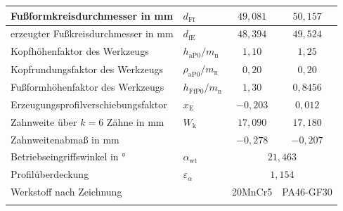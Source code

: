\begin{table}[htbp]
\begin{tabular}{llcc}
        Fußformkreisdurchmesser in mm       & $d_{\mathrm{Ff}}$                    & $49{,}081$                     & $50{,}157$ \\
        \hline
        erzeugter Fußkreisdurchmesser in mm & $d_{\mathrm{fE}}$                    & $48{,}394$                     & $49{,}524$ \\
        \hline
        Kopfhöhenfaktor des Werkzeugs       & $h_{\mathrm{aP0}}/m_{\mathrm{n}}$    & $1{,}10$                       & $1{,}25$   \\
        \hline
        Kopfrundungsfaktor des Werkzeugs    & $\rho_{\mathrm{aP0}}/m_{\mathrm{n}}$ & $0{,}20$                       & $0{,}20$   \\
        \hline
        Fußformhöhenfaktor des Werkzeugs    & $h_{\mathrm{FfP0}}/m_{\mathrm{n}}$   & $1{,}30$                       & $0{,}8456$ \\
        \hline
        Erzeugungsprofilverschiebungsfaktor & $x_{\mathrm{E}}$                     & $-0{,}203$                     & $0{,}012$  \\
        \hline
        Zahnweite über $k = 6$ Zähne in mm  & $W_{\mathrm{k}}$                     & $17{,}090$                     & $17{,}180$ \\
        \hline
        Zahnweitenabmaß in mm               &                                      & $-0{,}278$                     & $-0{,}207$ \\
        \hline
        Betriebseingriffswinkel in °        & $\alpha_{\mathrm{wt}}$               & \multicolumn{2}{c}{$21{,}463$}              \\
        \hline
        Profilüberdeckung                   & $\varepsilon_{\alpha}$               & \multicolumn{2}{c}{$1{,}154$}               \\
        \hline
        Werkstoff nach Zeichnung            &                                      & 20MnCr5                        & PA46-GF30  \\
        \hline
        \arrayrulecolor{black}
    \end{tabular}
\end{table}

